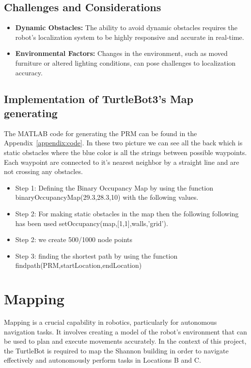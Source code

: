 \documentclass{article}
\begin{document}
	\subsection{Challenges and Considerations}
	\begin{itemize}
		\item \textbf{Dynamic Obstacles:} The ability to avoid dynamic obstacles requires the robot's localization system to be highly responsive and accurate in real-time.
		\item \textbf{Environmental Factors:} Changes in the environment, such as moved furniture or altered lighting conditions, can pose challenges to localization accuracy.
	\end{itemize}
	
	\subsection{Implementation of TurtleBot3's Map generating}
	The MATLAB code for generating the PRM can be found in the Appendix~\ref{appendix:code}. In these two picture we can see all the back which is static obstacles where the blue color is all the strings between possible waypoints. Each waypoint are connected to it's nearest neighbor by a straight line and are not crossing any obstacles. 
	\begin{itemize}
		\item Step 1: Defining the Binary Occupancy Map by using the function binaryOccupancyMap(29.3,28.3,10) with the following values.
		\item Step 2: For making static obstacles in the map then the following following has been used setOccupancy(map,[1,1],walls,'grid'). 
		\item Step 2: we create 500/1000 node points
		\item Step 3: finding the shortest path by using the function findpath(PRM,startLocation,endLocation)
	\end{itemize}
	
	\section{Mapping}
	Mapping is a crucial capability in robotics, particularly for autonomous navigation tasks. It involves creating a model of the robot's environment that can be used to plan and execute movements accurately. In the context of this project, the TurtleBot is required to map the Shannon building in order to navigate effectively and autonomously perform tasks in Locations B and C.
	
\end{document}
